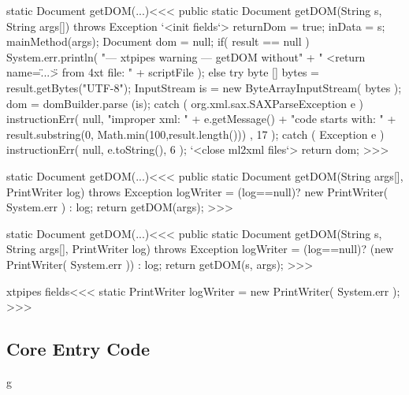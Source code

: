 \documentclass{article}
\begin{document}
{\<static Document getDOM(...)\><<<
public static Document getDOM(String s, String args[])
                                           throws Exception {
   `<init fields`>
   returnDom = true;
   inData = s;
   mainMethod(args);
   Document dom = null;
   if( result == null ){
     System.err.println(
       "--- xtpipes warning --- getDOM without"
         + " <return name=\"...\"> from 4xt file: "
         + scriptFile );
   } else {
      try{
         byte [] bytes = result.getBytes("UTF-8");
         InputStream is =  new ByteArrayInputStream( bytes );
         dom = domBuilder.parse (is);
      } catch ( org.xml.sax.SAXParseException e ){
         instructionErr( null, "improper xml: " + e.getMessage()
           + "\n code starts with: "
           + result.substring(0, Math.min(100,result.length()))
         , 17 );
      } catch ( Exception e ){
         instructionErr( null, e.toString(), 6 );
      }
      `<close ml2xml files`>
   }
   return dom;
}
>>>


\<static Document getDOM(...)\><<<
public static Document getDOM(String args[], PrintWriter log)
                               throws Exception {
   logWriter = (log==null)? new PrintWriter( System.err ) : log;
   return getDOM(args);
}
>>>

\<static Document getDOM(...)\><<<
public static Document getDOM(String s, String args[], PrintWriter log)
                                           throws Exception {
   logWriter = (log==null)? (new PrintWriter( System.err )) : log;
   return getDOM(s, args);
}
>>>




\<xtpipes fields\><<<
static PrintWriter logWriter = new PrintWriter( System.err );
>>>




\subsection{Core Entry Code}
g

}
\end{document}
